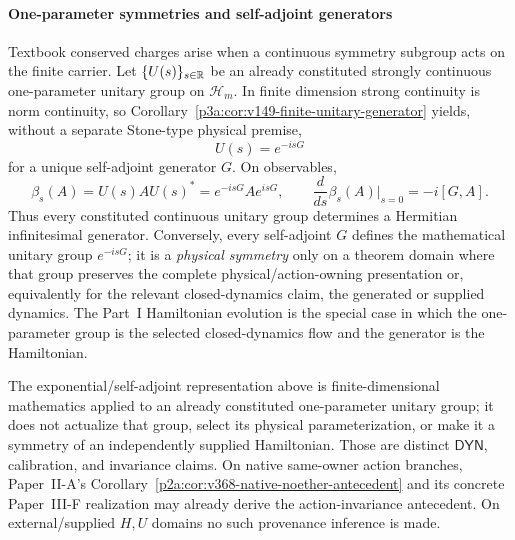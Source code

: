 \documentclass[12pt,a4paper]{article}
\begin{document}
\paragraph{One-parameter symmetries and self-adjoint generators}
\label{p4:sec:part2-symmetry-generators}

Textbook conserved charges arise when a continuous symmetry subgroup acts on
the finite carrier.  Let \(\{U(s)\}_{s\in\mathbb{R}}\) be an already constituted
strongly continuous one-parameter unitary group on \(\mathcal H_m\).  In
finite dimension strong continuity is norm continuity, so
Corollary~\ref{p3a:cor:v149-finite-unitary-generator} yields, without a
separate Stone-type physical premise,
\begin{equation}
\label{p4:eq:Us-generator}
U(s)=e^{-isG}
\end{equation}
for a unique self-adjoint generator \(G\).  On observables,
\begin{equation}
\label{p4:eq:observable-symmetry-flow}
\beta_s(A)=U(s)AU(s)^*=e^{-isG}Ae^{isG},
\qquad
\frac{d}{ds}\beta_s(A)\Big|_{s=0}=-i[G,A].
\end{equation}
Thus every constituted continuous unitary group determines a Hermitian
infinitesimal generator.  Conversely, every self-adjoint \(G\) defines the
mathematical unitary group \(e^{-isG}\); it is a \emph{physical symmetry}
only on a theorem domain where that group preserves the complete
physical/action-owning presentation or, equivalently for the relevant
closed-dynamics claim, the generated or supplied dynamics.  The Part~I
Hamiltonian evolution is the special case in which the one-parameter group is
the selected closed-dynamics flow and the generator is the Hamiltonian.

\begin{remark}
\label{p4:rem:v458-finite-generator-status}
The exponential/self-adjoint representation above is finite-dimensional
mathematics applied to an already constituted one-parameter unitary group; it
does not actualize that group, select its physical parameterization, or make
it a symmetry of an independently supplied Hamiltonian.  Those are distinct
\(\mathsf{DYN}\), calibration, and invariance claims.  On native same-owner
action branches, Paper~II-A's
Corollary~\ref{p2a:cor:v368-native-noether-antecedent} and its concrete
Paper~III-F realization may already derive the action-invariance antecedent.
On external/supplied \(H,U\) domains no such provenance inference is made.
\end{remark}
\end{document}
